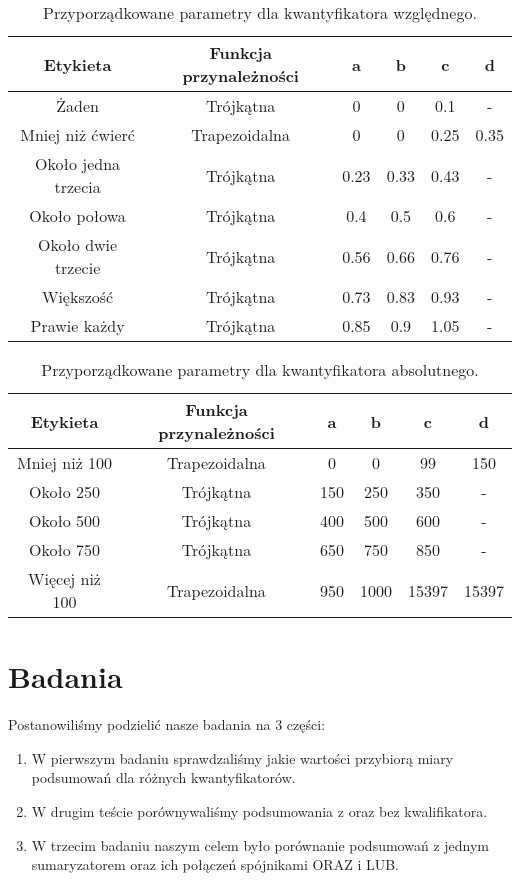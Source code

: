\documentclass{classrep}
\begin{document}
\begin{table}[H]
	\centering
	\begin{tabular}{c c c c c c} 
		\hline
		\textbf{Etykieta} & \textbf{Funkcja przynależności} & \textbf{a} & \textbf{b} & \textbf{c} &  \textbf{d} \\ [0.5ex] 
		\hline
		\hline 
		Żaden & Trójkątna & 0 & 0 & 0.1 & - \\ 
		Mniej niż ćwierć & Trapezoidalna & 0 & 0 & 0.25 & 0.35 \\
		Około jedna trzecia & Trójkątna & 0.23 & 0.33 & 0.43 & - \\
		Około połowa & Trójkątna & 0.4 & 0.5 & 0.6 & - \\
		Około dwie trzecie & Trójkątna & 0.56 & 0.66 & 0.76 & - \\
		Większość & Trójkątna & 0.73 & 0.83 & 0.93 & - \\
		Prawie każdy & Trójkątna & 0.85 & 0.9 & 1.05 & - \\
		\hline
	\end{tabular}
	\caption{Przyporządkowane parametry dla kwantyfikatora względnego.}
\end{table}
\begin{table}[H]
	\centering
	\begin{tabular}{c c c c c c} 
		\hline
		\textbf{Etykieta} & \textbf{Funkcja przynależności} & \textbf{a} & \textbf{b} & \textbf{c} &  \textbf{d} \\ [0.5ex] 
		\hline
		\hline 
		Mniej niż 100 & Trapezoidalna & 0 & 0 & 99 & 150 \\ 
		Około 250 & Trójkątna & 150 & 250 & 350 & - \\
		Około 500 & Trójkątna & 400 & 500 & 600 & - \\
		Około 750 & Trójkątna & 650 & 750 & 850 & - \\
		Więcej niż 100 & Trapezoidalna & 950 & 1000 & 15397 & 15397 \\
		\hline
	\end{tabular}
	\caption{Przyporządkowane parametry dla kwantyfikatora absolutnego.}
\end{table}




\section{Badania}

Postanowiliśmy podzielić nasze badania na 3 części:
\begin{enumerate}
	\item W pierwszym badaniu sprawdzaliśmy jakie wartości przybiorą miary podsumowań dla różnych kwantyfikatorów.
	\item W drugim teście porównywaliśmy podsumowania z oraz bez kwalifikatora.
	\item W trzecim badaniu naszym celem było porównanie podsumowań z jednym sumaryzatorem oraz ich połączeń spójnikami ORAZ i LUB.
\end{enumerate}
\end{document}
